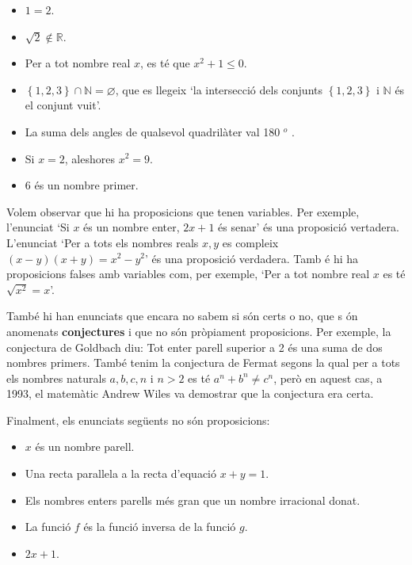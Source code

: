 \begin{itemize}
\item $1=2$.

\item $\sqrt{2}\notin\mathbb{R}$.

\item Per a tot nombre real $x$, es t\'{e} que $x^{2}+1\leq0$.

\item $\left\{ 1,2,3\right\} \cap\mathbb{N}=\varnothing$, que es llegeix `la
intersecci\'{o} dels conjunts $\left\{ 1,2,3\right\} $ i $\mathbb{N}$ \'{e}s
el conjunt vuit'.

\item La suma dels angles de qualsevol quadril\`{a}ter val 180%
${{}^o}$%
.

\item Si $x=2$, aleshores $x^{2}=9$.

\item 6 \'{e}s un nombre primer.
\end{itemize}

Volem observar que hi ha proposicions que tenen variables. Per exemple,
l'enunciat `Si $x$ \'{e}s un nombre enter, $2x+1$ \'{e}s senar' \'{e}s una
proposici\'{o} vertadera. L'enunciat `Per a tots els nombres reals $x,y$ es
compleix $(x-y)(x+y)=x^{2}-y^{2}$' \'{e}s una proposici\'{o} verdadera. Tamb%
\'{e} hi ha proposicions falses amb variables com, per exemple, `Per a tot
nombre real $x$ es t\'{e} $\sqrt{x^{2}}=x$'.

Tamb\'{e} hi han enunciats que encara no sabem si s\'{o}n certs o no, que s%
\'{o}n anomenats \textbf{conjectures} i que no s\'{o}n pr\`{o}piament
proposicions. Per exemple, la conjectura de Goldbach diu: Tot enter parell
superior a 2 \'{e}s una suma de dos nombres primers. Tamb\'{e} tenim la
conjectura de Fermat segons la qual per a tots els nombres naturals $a,b,c,n$
i $n>2$ es t\'{e} $a^{n}+b^{n}\neq c^{n}$, per\`{o} en aquest cas, a 1993,
el matem\`{a}tic Andrew Wiles va demostrar que la conjectura era certa.

Finalment, els enunciats seg\"{u}ents no s\'{o}n proposicions:

\begin{itemize}
\item $x$ \'{e}s un nombre parell.

\item Una recta paral\textperiodcentered lela a la recta d'equaci\'{o} $%
x+y=1 $.

\item Els nombres enters parells m\'{e}s gran que un nombre irracional donat.

\item La funci\'{o} $f$ \'{e}s la funci\'{o} inversa de la funci\'{o} $g$.

\item $2x+1$.
\end{itemize}

